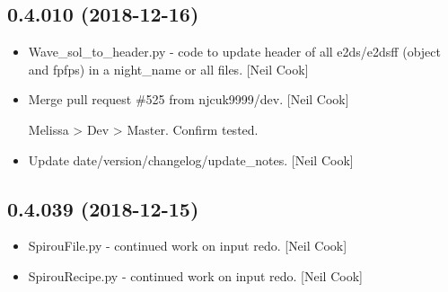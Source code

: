 \documentclass[a4paper,10pt,english]{report}
\begin{document}
\subsection{0.4.010 (2018-12-16)}
\label{\detokenize{misc/changelog:id229}}\begin{itemize}
\item {} 
Wave\_sol\_to\_header.py - code to update header of all e2ds/e2dsff
(object and fpfps) in a night\_name or all files. {[}Neil Cook{]}

\item {} 
Merge pull request \#525 from njcuk9999/dev. {[}Neil Cook{]}

Melissa \textendash{}\textgreater{} Dev \textendash{}\textgreater{} Master. Confirm tested.

\item {} 
Update date/version/changelog/update\_notes. {[}Neil Cook{]}

\end{itemize}


\subsection{0.4.039 (2018-12-15)}
\label{\detokenize{misc/changelog:id230}}\begin{itemize}
\item {} 
SpirouFile.py - continued work on input redo. {[}Neil Cook{]}

\item {} 
SpirouRecipe.py - continued work on input redo. {[}Neil Cook{]}

\end{itemize}
\end{document}
